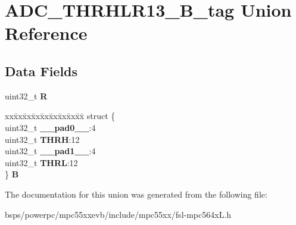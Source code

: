 \hypertarget{unionADC__THRHLR13__32B__tag}{}\section{A\+D\+C\+\_\+\+T\+H\+R\+H\+L\+R13\+\_\+B\+\_\+tag Union Reference}
\label{unionADC__THRHLR13__32B__tag}
\subsection*{Data Fields}
\begin{DoxyCompactItemize}
\item 
\mbox{\label{unionADC__THRHLR13__32B__tag_a17e60ca88cf23be58adbf362026c1ab5}} 
uint32\+\_\+t {\bfseries R}
\item 
\mbox{\label{unionADC__THRHLR13__32B__tag_a3f5e89be3c0b990f33a682f9cb6cdaf9}} 
\begin{tabbing}
xx\=xx\=xx\=xx\=xx\=xx\=xx\=xx\=xx\=\kill
struct \{\\
\>uint32\_t {\bfseries \_\_pad0\_\_}:4\\
\>uint32\_t {\bfseries THRH}:12\\
\>uint32\_t {\bfseries \_\_pad1\_\_}:4\\
\>uint32\_t {\bfseries THRL}:12\\
\} {\bfseries B}\\

\end{tabbing}\end{DoxyCompactItemize}


The documentation for this union was generated from the following file\+:\begin{DoxyCompactItemize}
\item 
bsps/powerpc/mpc55xxevb/include/mpc55xx/fsl-\/mpc564x\+L.\+h\end{DoxyCompactItemize}
